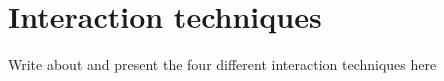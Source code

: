 \section{Interaction techniques}
Write about and present the four different interaction techniques here